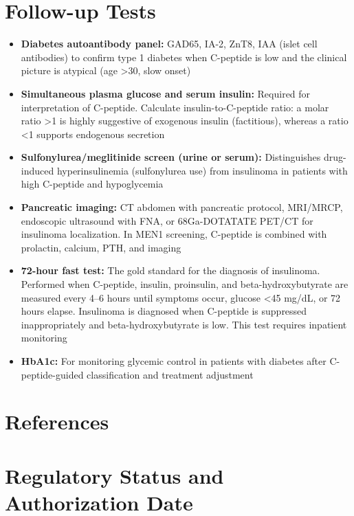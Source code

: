\section*{Follow-up Tests}
\begin{itemize}
  \item \textbf{Diabetes autoantibody panel:} GAD65, IA-2, ZnT8, IAA (islet cell antibodies) to confirm type 1 diabetes when C-peptide is low and the clinical picture is atypical (age >30, slow onset)
  \item \textbf{Simultaneous plasma glucose and serum insulin:} Required for interpretation of C-peptide. Calculate insulin-to-C-peptide ratio: a molar ratio >1 is highly suggestive of exogenous insulin (factitious), whereas a ratio <1 supports endogenous secretion
  \item \textbf{Sulfonylurea/meglitinide screen (urine or serum):} Distinguishes drug-induced hyperinsulinemia (sulfonylurea use) from insulinoma in patients with high C-peptide and hypoglycemia
  \item \textbf{Pancreatic imaging:} CT abdomen with pancreatic protocol, MRI/MRCP, endoscopic ultrasound with FNA, or 68Ga-DOTATATE PET/CT for insulinoma localization. In MEN1 screening, C-peptide is combined with prolactin, calcium, PTH, and imaging
  \item \textbf{72-hour fast test:} The gold standard for the diagnosis of insulinoma. Performed when C-peptide, insulin, proinsulin, and beta-hydroxybutyrate are measured every 4--6 hours until symptoms occur, glucose <45 mg/dL, or 72 hours elapse. Insulinoma is diagnosed when C-peptide is suppressed inappropriately and beta-hydroxybutyrate is low. This test requires inpatient monitoring
  \item \textbf{HbA1c:} For monitoring glycemic control in patients with diabetes after C-peptide-guided classification and treatment adjustment
\end{itemize}

\section*{References}



\clearpage
\section*{Regulatory Status and Authorization Date}

\clearpage

